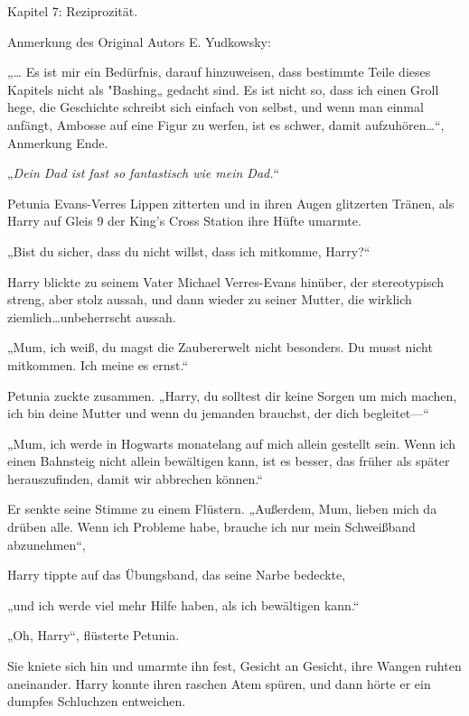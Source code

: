 

\hypertarget{reziprozituxe4t}{%

Kapitel 7: Reziprozität.

Anmerkung des Original Autors E. Yudkowsky:

„… Es ist mir ein Bedürfnis, darauf hinzuweisen, dass bestimmte Teile dieses Kapitels nicht als "Bashing„ gedacht sind. Es ist nicht so, dass ich einen Groll hege, die Geschichte schreibt sich einfach von selbst, und wenn man einmal anfängt, Ambosse auf eine Figur zu werfen, ist es schwer, damit aufzuhören…“, Anmerkung Ende.

„\emph{Dein Dad ist fast so fantastisch wie mein Dad.}“

Petunia Evans-Verres Lippen zitterten und in ihren Augen glitzerten Tränen, als Harry auf Gleis 9 der King's Cross Station ihre Hüfte umarmte.

„Bist du sicher, dass du nicht willst, dass ich mitkomme, Harry?“

Harry blickte zu seinem Vater Michael Verres-Evans hinüber, der stereotypisch streng, aber stolz aussah, und dann wieder zu seiner Mutter, die wirklich ziemlich…unbeherrscht aussah.

„Mum, ich weiß, du magst die Zaubererwelt nicht besonders. Du musst nicht mitkommen. Ich meine es ernst.“

Petunia zuckte zusammen. „Harry, du solltest dir keine Sorgen um mich machen, ich bin deine Mutter und wenn du jemanden brauchst, der dich begleitet—“

„Mum, ich werde in Hogwarts monatelang auf mich allein gestellt sein. Wenn ich einen Bahnsteig nicht allein bewältigen kann, ist es besser, das früher als später herauszufinden, damit wir abbrechen können.“

Er senkte seine Stimme zu einem Flüstern. „Außerdem, Mum, lieben mich da drüben alle. Wenn ich Probleme habe, brauche ich nur mein Schweißband abzunehmen“,

Harry tippte auf das Übungsband, das seine Narbe bedeckte,

„und ich werde viel mehr Hilfe haben, als ich bewältigen kann.“

„Oh, Harry“, flüsterte Petunia.

Sie kniete sich hin und umarmte ihn fest, Gesicht an Gesicht, ihre Wangen ruhten aneinander. Harry konnte ihren raschen Atem spüren, und dann hörte er ein dumpfes Schluchzen entweichen.

}
